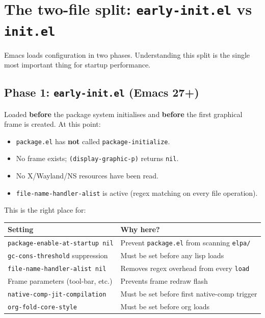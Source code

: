 \section{The two-file split: \texttt{early-init.el} vs \texttt{init.el}}\label{the-two-file-split-early-init.el-vs-init.el}

Emacs loads configuration in two phases. Understanding this split is the single most important thing for startup performance.

\subsection{Phase 1: \texttt{early-init.el} (Emacs 27+)}\label{phase-1-early-init.el-emacs-27}

Loaded \textbf{before} the package system initialises and \textbf{before} the first graphical frame is created. At this point:

\begin{itemize}
\item \texttt{package.el} has \textbf{not} called \texttt{package-initialize}.
\item No frame exists; \texttt{(display-graphic-p)} returns \texttt{nil}.
\item No X/Wayland/NS resources have been read.
\item \texttt{file-name-handler-alist} is active (regex matching on every file operation).
\end{itemize}

This is the right place for:

\begin{longtable}[]{@{}ll@{}}
\toprule
Setting & Why here? \\
\midrule
\texttt{package-enable-at-startup nil} & Prevent \texttt{package.el} from scanning \texttt{elpa/} \\
\texttt{gc-cons-threshold} suppression & Must be set before any lisp loads \\
\texttt{file-name-handler-alist nil} & Removes regex overhead from every \texttt{load} \\
Frame parameters (tool-bar, etc.) & Prevents frame redraw flash \\
\texttt{native-comp-jit-compilation} & Must be set before first native-comp trigger \\
\texttt{org-fold-core-style} & Must be set before org loads \\
\bottomrule
\end{longtable}

